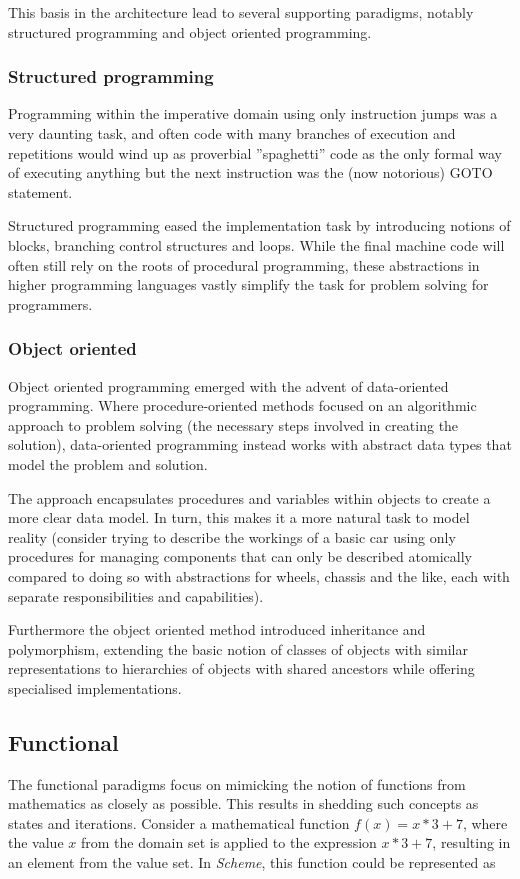 This basis in the architecture lead to several supporting paradigms, notably structured programming and object oriented programming.

\subsubsection*{Structured programming}
Programming within the imperative domain using only instruction jumps was a very daunting task, and often code with many branches of execution and repetitions would wind up as proverbial ''spaghetti'' code as the only formal way of executing anything but the next instruction was the (now notorious) GOTO statement.

Structured programming eased the implementation task by introducing notions of blocks, branching control structures and loops. While the final machine code will often still rely on the roots of procedural programming, these abstractions in higher programming languages vastly simplify the task for problem solving for programmers.

\subsubsection*{Object oriented}
Object oriented programming emerged with the advent of data-oriented programming. Where procedure-oriented methods focused on an algorithmic approach to problem solving (the necessary steps involved in creating the solution), data-oriented programming instead works with abstract data types that model the problem and solution.

The approach encapsulates procedures and variables within objects to create a more clear data model. In turn, this makes it a more natural task to model reality (consider trying to describe the workings of a basic car using only procedures for managing components that can only be described atomically compared to doing so with abstractions for wheels, chassis and the like, each with separate responsibilities and capabilities).

Furthermore the object oriented method introduced inheritance and polymorphism, extending the basic notion of classes of objects with similar representations to hierarchies of objects with shared ancestors while offering specialised implementations.

\subsection{Functional}
The functional paradigms focus on mimicking the notion of functions from mathematics as closely as possible. This results in shedding such concepts as states and iterations. Consider a mathematical function $f(x) = x*3+7$, where the value $x$ from the domain set is applied to the expression $x*3+7$, resulting in an element from the value set. In \emph{Scheme}, this function could be represented as

